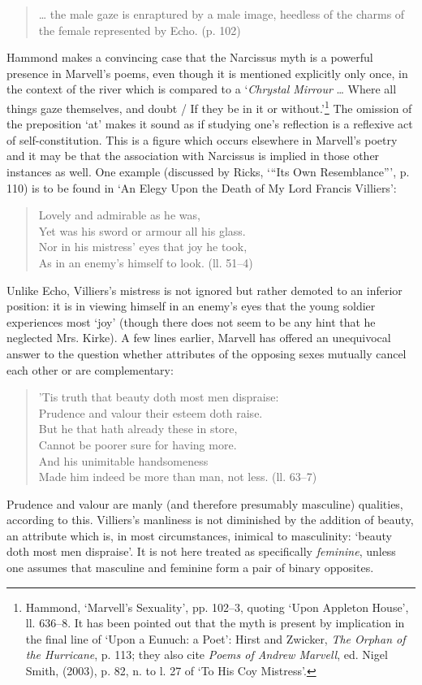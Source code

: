 ﻿\documentclass[12pt]{article}
\newcommand{\citedtitle}[1]{\textit{#1}}
\begin{document}
\begin{quote}
… the male gaze is enraptured by a male image, heedless of the charms of the female represented by Echo. (p. 102)
\end{quote}
Hammond makes a convincing case that the Narcissus myth is a powerful presence in
Marvell’s poems, even though it is mentioned explicitly only once, in the
context of the river which is compared to a ‘\emph{Chrystal Mirrour} … Where all things gaze
themselves, and doubt / If they be in it or without.’\footnote{Hammond, ‘Marvell’s Sexuality’, pp. 102–3, quoting ‘Upon Appleton House’, ll. 636–8. It has been pointed out that the myth is present by implication in the final line of ‘Upon a Eunuch: a Poet’: Hirst and Zwicker, \citedtitle{The Orphan of the Hurricane}, p. 113; they also cite \citedtitle{Poems of Andrew Marvell}, ed. Nigel Smith, (2003), p. 82, n. to l. 27 of ‘To His Coy Mistress’.} The
omission of the preposition ‘at’ makes it sound as if studying one’s reflection
is a reflexive act of self-constitution. This is a figure which occurs
elsewhere in Marvell’s poetry and it may be that the association with Narcissus
is implied in those other instances as well. One example (discussed by Ricks, ‘“Its
Own Resemblance”’, p. 110) is to be found in ‘An Elegy Upon the Death of
My Lord Francis Villiers’:

\begin{verse}
Lovely and admirable as he was,\\
Yet was his sword or armour all his glass.\\
Nor in his mistress’ eyes that joy he took,\\
As in an enemy’s himself to look. (ll. 51–4)
\end{verse}
Unlike Echo, Villiers’s mistress is not ignored but rather demoted to an inferior
position: it is in viewing himself in an enemy’s eyes that the young soldier
experiences most ‘joy’ (though there does not seem to be any hint that he neglected
Mrs. Kirke). A few lines earlier, Marvell has offered an unequivocal answer to
the question whether attributes of the opposing sexes mutually cancel each
other or are complementary:

\begin{verse}
’Tis truth that beauty doth most men dispraise:\\
Prudence and valour their esteem doth raise.\\
But he that hath already these in store,\\
Cannot be poorer sure for having more.\\
And his unimitable handsomeness\\
Made him indeed be more than man, not less. (ll. 63–7)
\end{verse}
Prudence and valour are manly (and therefore presumably masculine) qualities, according
to this. Villiers’s manliness is not diminished by the addition of beauty, an
attribute which is, in most circumstances, inimical to masculinity: ‘beauty
doth most men dispraise’. It is not here treated as specifically \emph{feminine}, unless one assumes
that masculine and feminine form a pair of binary opposites.
\end{document}
